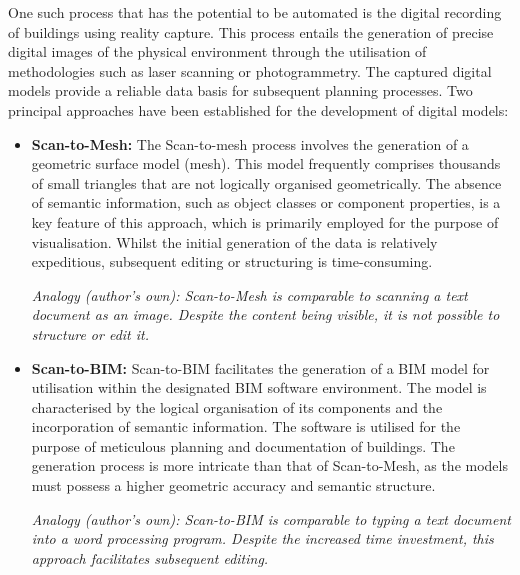 \begin{English}
    One such process that has the potential to be automated is the digital recording of buildings using reality capture. This process entails the generation of precise digital images of the physical environment through the utilisation of methodologies such as laser scanning or photogrammetry. The captured digital models provide a reliable data basis for subsequent planning processes. Two principal approaches have been established for the development of digital models:

    \begin{itemize}
        \item \textbf{Scan-to-Mesh:} The Scan-to-mesh process involves the generation of a geometric surface model (mesh). This model frequently comprises thousands of small triangles that are not logically organised geometrically. The absence of semantic information, such as object classes or component properties, is a key feature of this approach, which is primarily employed for the purpose of visualisation. Whilst the initial generation of the data is relatively expeditious, subsequent editing or structuring is time-consuming. \cite{daiScan2MeshUnstructuredRange2019}
        
        \textit{Analogy (author's own): Scan-to-Mesh is comparable to scanning a text document as an image. Despite the content being visible, it is not possible to structure or edit it.}

        \item \textbf{Scan-to-BIM:} Scan-to-BIM facilitates the generation of a BIM model for utilisation within the designated BIM software environment. The model is characterised by the logical organisation of its components and the incorporation of semantic information. The software is utilised for the purpose of meticulous planning and documentation of buildings. The generation process is more intricate than that of Scan-to-Mesh, as the models must possess a higher geometric accuracy and semantic structure. \cite{eichlerBIMcertHandbuchGrundlagenwissen2023}
        
        \textit{Analogy (author's own): Scan-to-BIM is comparable to typing a text document into a word processing program. Despite the increased time investment, this approach facilitates subsequent editing.}
    \end{itemize}
\end{English}

